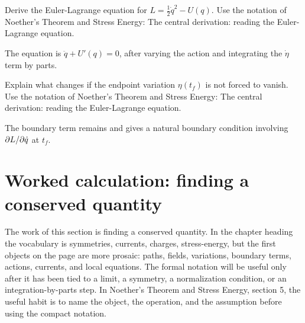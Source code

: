 \begin{exercise}
Derive the Euler-Lagrange equation for \(L=\frac12\dot q^2-U(q)\).  Use the notation of Noether's Theorem and Stress Energy: The central derivation: reading the Euler-Lagrange equation.
\begin{answer}
The equation is \(\ddot q+U'(q)=0\), after varying the action and integrating the \(\dot\eta\) term by parts.
\end{answer}
\end{exercise}

\begin{exercise}
Explain what changes if the endpoint variation \(\eta(t_f)\) is not forced to vanish.  Use the notation of Noether's Theorem and Stress Energy: The central derivation: reading the Euler-Lagrange equation.
\begin{answer}
The boundary term remains and gives a natural boundary condition involving \(\partial L/\partial\dot q\) at \(t_f\).
\end{answer}
\end{exercise}



\section{Worked calculation: finding a conserved quantity}













The work of this section is finding a conserved quantity.  In the chapter heading the vocabulary is symmetries, currents, charges, stress-energy, but the first objects on the page are more prosaic: paths, fields, variations, boundary terms, actions, currents, and local equations.  The formal notation will be useful only after it has been tied to a limit, a symmetry, a normalization condition, or an integration-by-parts step.  In Noether's Theorem and Stress Energy, section 5, the useful habit is to name the object, the operation, and the assumption before using the compact notation.

